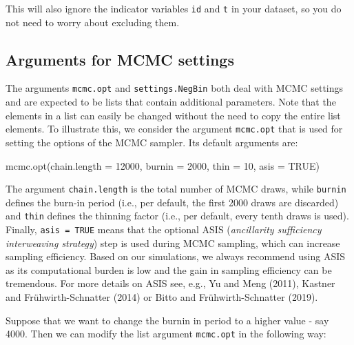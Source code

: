 \documentclass[a4paper, preprint, 3p,
authoryear]{elsarticle} %
\newenvironment{Shaded}{\begin{snugshade}}{\end{snugshade}}
\newcommand{\NormalTok}[1]{#1}
\begin{document}
This will also ignore the indicator variables \texttt{id} and \texttt{t}
in your dataset, so you do not need to worry about excluding them.

\subsection{Arguments for MCMC
settings}\label{arguments-for-mcmc-settings}

The arguments \texttt{mcmc.opt} and \texttt{settings.NegBin} both deal
with MCMC settings and are expected to be lists that contain additional
parameters. Note that the elements in a list can easily be changed
without the need to copy the entire list elements. To illustrate this,
we consider the argument \texttt{mcmc.opt} that is used for setting the
options of the MCMC sampler. Its default arguments are:

\begin{Shaded}
\begin{Highlighting}[]
\NormalTok{mcmc.opt(chain.length = 12000, burnin = 2000, thin = 10, asis = TRUE)}
\end{Highlighting}
\end{Shaded}

The argument \texttt{chain.length} is the total number of MCMC draws,
while \texttt{burnin} defines the burn-in period (i.e., per default, the
first 2000 draws are discarded) and \texttt{thin} defines the thinning
factor (i.e., per default, every tenth draws is used). Finally,
\texttt{asis = TRUE} means that the optional ASIS
(\textit{ancillarity sufficiency interweaving strategy}) step is used
during MCMC sampling, which can increase sampling efficiency. Based on
our simulations, we always recommend using ASIS as its computational
burden is low and the gain in sampling efficiency can be tremendous. For
more details on ASIS see, e.g., Yu and Meng (2011), Kastner and
Frühwirth-Schnatter (2014) or Bitto and Frühwirth-Schnatter (2019).

Suppose that we want to change the burnin in period to a higher value -
say 4000. Then we can modify the list argument \texttt{mcmc.opt} in the
following way:

\begin{Shaded}
\end{Shaded}
\end{document}
